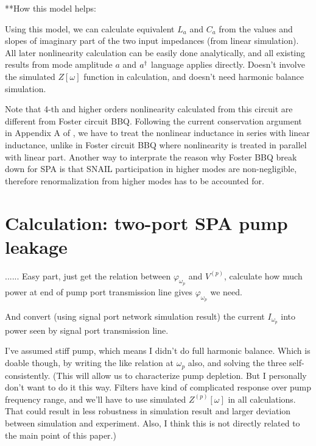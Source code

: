 \documentclass[aip,reprint]{revtex4-2}
\begin{document}
\par
\par
**How this model helps: 

Using this model, we can calculate equivalent $L_a$ and $C_a$ from the values and slopes of imaginary part of the two input impedances (from linear simulation). 
All later nonlinearity calculation can be easily done analytically, and all existing results from mode amplitude $a$ and $a^\dagger$ language applies directly. 
Doesn't involve the simulated $Z[\omega]$ function in calculation, and doesn't need harmonic balance simulation. 

Note that 4-th and higher orders nonlinearity calculated from this circuit are different from Foster circuit BBQ. Following the current conservation argument in Appendix A of \cite{SPA}, we have to treat the nonlinear inductance in series with linear inductance, unlike in Foster circuit BBQ where nonlinearity is treated in parallel with linear part. Another way to interprate the reason why Foster BBQ break down for SPA is that SNAIL participation in higher modes are non-negligible, therefore renormalization from higher modes has to be accounted for. 






\section{Calculation: two-port SPA pump leakage}\label{appen:leakage}

...... Easy part, just get the relation between $\varphi_{\omega_p}$ and $V^{(p)}$, calculate how much power at end of pump port transmission line gives $\varphi_{\omega_p}$ we need. 

And convert (using signal port network simulation result) the current $I_{\omega_p}$ into power seen by signal port transmission line. 

I've assumed stiff pump, which means I didn't do full harmonic balance. Which is doable though, by writing the  like relation at $\omega_p$ also, and solving the three self-consistently. 
(This will allow us to characterize pump depletion. But I personally don't want to do it this way. Filters have kind of complicated response over pump frequency range, and we'll have to use simulated $Z^{(p)}[\omega]$ in all calculations. That could result in less robustness in simulation result and larger deviation between simulation and experiment. Also, I think this is not directly related to the main point of this paper.)
\end{document}
